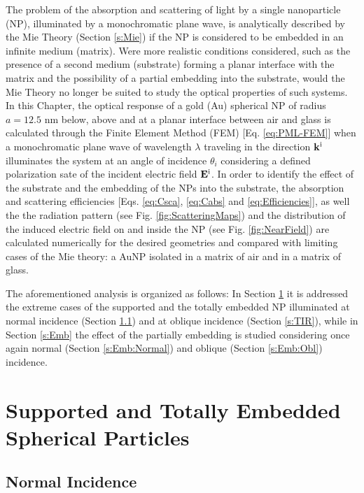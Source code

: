 \documentclass[11pt]{Latex/Classes/PhDthesisPSnPDF}
\begin{document}
    The problem of the absorption and scattering of light by a single nanoparticle (NP), illuminated by a monochromatic plane wave, is analytically described by the Mie Theory (Section \ref{s:Mie}) if the NP is considered to be embedded in an infinite medium (matrix). Were more realistic conditions considered, such as the presence of a second medium (substrate) forming a planar interface with the matrix and the possibility of a partial embedding into the substrate, would the Mie Theory no longer be suited to study the optical properties of such systems. In this Chapter, the optical response of a gold (Au) spherical NP of radius $a = 12.5$ nm below, above and at a planar interface between air and glass is calculated through the Finite Element Method (FEM) [Eq. \eqref{eq:PML-FEM}] when a monochromatic plane wave of wavelength $\lambda$ traveling in the direction $\vb{k}^\text{i}$ illuminates the system at an angle of incidence $\theta_i$ considering a defined polarization sate of the incident electric field $\vb{E}^\text{i}$. In order to identify the effect of the substrate and the embedding of the NPs into the substrate, the absorption and scattering  efficiencies [Eqs. \eqref{eq:Csca}, \eqref{eq:Cabs} and \eqref{eq:Efficiencies}], as well the the radiation pattern (see Fig. \ref{fig:ScatteringMaps}) and the distribution of the induced electric field on and inside the NP (see Fig. \ref{fig:NearField}) are calculated numerically for the desired geometries and compared with limiting cases of the Mie theory: a AuNP isolated in a matrix of air and in a matrix of glass.

    The aforementioned analysis is organized as follows: In Section \ref{s:Totally} it is addressed the extreme cases of the supported and the totally embedded NP illuminated at normal incidence (Section \ref{s:Totally:Normal}) and at oblique incidence (Section \ref{s:TIR}), while in Section \ref{s:Emb} the effect of the partially embedding is studied considering once again  normal (Section \ref{s:Emb:Normal}) and oblique (Section \ref{s:Emb:Obl}) incidence.

    \section{Supported and Totally Embedded Spherical Particles}
     \label{s:Totally}
        

        \subsection{Normal Incidence}
        
         \label{s:Totally:Normal}
\end{document}
